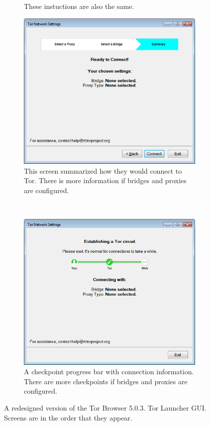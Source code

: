 \documentclass[USenglish,oneside,twocolumn]{article}
\begin{document}
\begin{figure}
\begin{subfigure}[b]{0.35\textwidth}
	\caption{These instuctions are also the same.}
	\label{fig:new-bridge-help}
\end{subfigure}
\begin{subfigure}[b]{0.35\textwidth}
	\includegraphics[width=\textwidth]{screenshots/NEW-summary.png}
	\caption{This screen summarized how they would connect to Tor. There is more information if bridges and proxies are configured.}
	\label{fig:new-summary}
\end{subfigure}
~~~~~~~~~~
\begin{subfigure}[b]{0.35\textwidth}
	\includegraphics[width=\textwidth]{screenshots/NEW-progress.png}
	\caption{A checkpoint progress bar with connection information. There are more checkpoints if bridges and proxies are configured.}
	\label{fig:new-progress}
\end{subfigure}
\caption{
A redesigned version of the Tor Browser 5.0.3. Tor Launcher GUI. Screens are in the order that they appear. 
}
\label{fig:new-interface}
\end{figure} 
\end{document}
